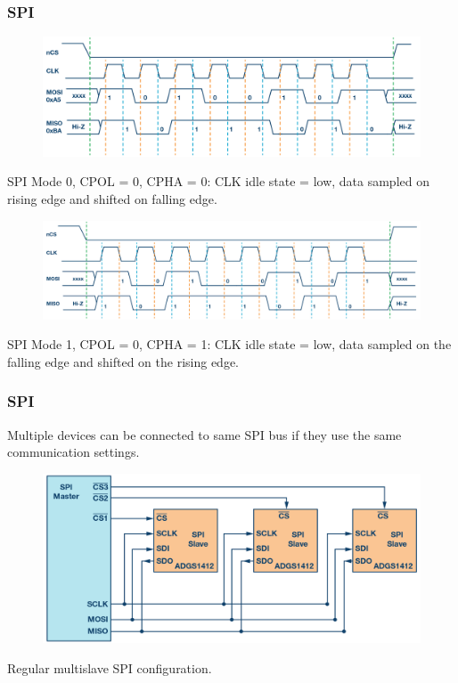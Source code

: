 \documentclass[t]{beamer}
\begin{document}
\begin{frame}[t]
\frametitle{SPI}

\begin{figure}
	\includegraphics[width=0.7\linewidth]{spiMode0.png}
\end{figure}
SPI Mode 0, CPOL = 0, CPHA = 0: CLK idle state = low, data sampled on rising edge and shifted on falling edge.
\begin{figure}
	\includegraphics[width=0.7\linewidth]{spiMode1.png}
\end{figure}
SPI Mode 1, CPOL = 0, CPHA = 1: CLK idle state = low, data sampled on the falling edge and shifted on the rising edge.
\end{frame}


\begin{frame}[t]
\frametitle{SPI}
Multiple devices can be connected to same SPI bus if they use the same communication settings. 
\begin{figure}
	\includegraphics[width=0.9\linewidth]{spiMultiSlave.png}
\end{figure}
Regular multislave SPI configuration.
\end{frame}

\end{document}
